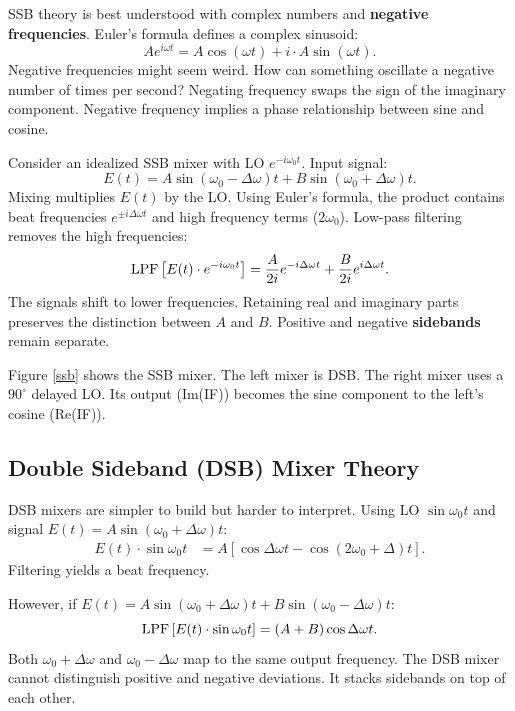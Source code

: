 \documentclass[11pt,preprint]{aastex}
\def\wLO{\omega_0}
\begin{document}
\noindent
SSB theory is best understood with complex numbers and {\bf negative frequencies}.
Euler's formula defines a complex sinusoid:
\begin{equation}
Ae^{i\omega t} = A\cos(\omega t) + i\cdot A\sin(\omega t).
\end{equation}
Negative frequencies might seem weird.
How can something oscillate a negative number of times per second?
Negating frequency swaps the sign of the imaginary component.
Negative frequency implies a phase relationship between sine and cosine.

Consider an idealized SSB mixer with LO $e^{-i\wLO t}$.
Input signal:
\begin{equation}
E(t)=A\sin (\wLO-\Delta\omega)t + B \sin (\wLO+\Delta\omega)t.
\end{equation}
Mixing multiplies $E(t)$ by the LO.
Using Euler's formula, the product contains beat frequencies $e^{\pm i \Delta\omega t}$
and high frequency terms ($2\wLO$).
Low-pass filtering removes the high frequencies:
\begin{equation}
{\rm LPF}\left[E(t)\cdot e^{-i\wLO t}\right] =
  \frac{A}{2i}e^{-i\Delta\omega t} + \frac{B}{2i} e^{i\Delta\omega t}.
\end{equation}
The signals shift to lower frequencies.
Retaining real and imaginary parts preserves the distinction between $A$ and $B$.
Positive and negative {\bf sidebands} remain separate.

Figure \ref{ssb} shows the SSB mixer.
The left mixer is DSB.
The right mixer uses a $90^\circ$ delayed LO.
Its output (Im(IF)) becomes the sine component to the left's cosine (Re(IF)).


\subsection{Double Sideband (DSB) Mixer Theory}

\noindent
DSB mixers are simpler to build but harder to interpret.
Using LO $\sin \wLO t$ and signal $E(t)=A\sin(\wLO+\Delta\omega)t$:
\begin{align}
E(t)\cdot \sin\wLO t &= A\left[\cos\Delta\omega t - \cos(2\wLO +\Delta)t\right].
\end{align}
Filtering yields a beat frequency.

However, if $E(t)=A\sin(\wLO +\Delta\omega)t + B\sin(\wLO -\Delta\omega)t$:
\begin{equation}
{\rm LPF}\left[E(t)\cdot \sin\wLO t\right] = (A+B)\cos\Delta\omega t.
\end{equation}
Both $\wLO +\Delta\omega$ and $\wLO -\Delta\omega$ map to the same output frequency.
The DSB mixer cannot distinguish positive and negative deviations.
It stacks sidebands on top of each other.
\end{document}
